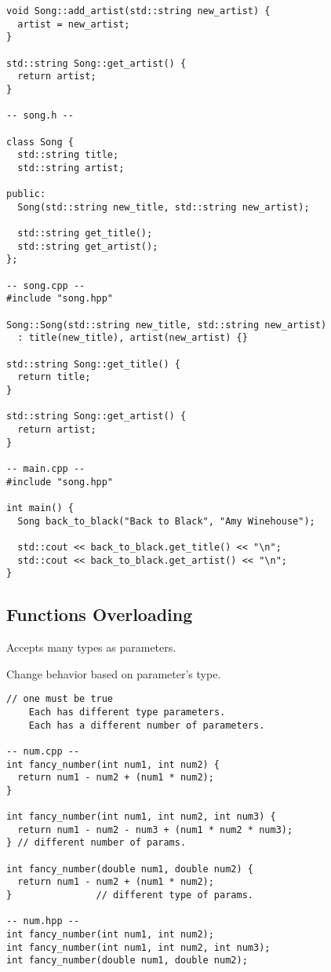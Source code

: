 \documentclass[openany]{report}
\begin{document}
\begin{verbatim}
void Song::add_artist(std::string new_artist) {
  artist = new_artist;
}

std::string Song::get_artist() {
  return artist;
}

-- song.h --

class Song {
  std::string title;
  std::string artist;

public:
  Song(std::string new_title, std::string new_artist);

  std::string get_title();
  std::string get_artist();
};

-- song.cpp --
#include "song.hpp"

Song::Song(std::string new_title, std::string new_artist)
  : title(new_title), artist(new_artist) {}

std::string Song::get_title() {
  return title;
}

std::string Song::get_artist() {
  return artist;
}

-- main.cpp --
#include "song.hpp"

int main() { 
  Song back_to_black("Back to Black", "Amy Winehouse");

  std::cout << back_to_black.get_title() << "\n";
  std::cout << back_to_black.get_artist() << "\n";
}
\end{verbatim}

\subsection{Functions Overloading}

Accepts many types as parameters.

Change behavior based on parameter's type.

\begin{verbatim}
// one must be true
    Each has different type parameters.
    Each has a different number of parameters.
    
-- num.cpp --
int fancy_number(int num1, int num2) {
  return num1 - num2 + (num1 * num2);
}

int fancy_number(int num1, int num2, int num3) {
  return num1 - num2 - num3 + (num1 * num2 * num3);
} // different number of params.

int fancy_number(double num1, double num2) {
  return num1 - num2 + (num1 * num2);
}               // different type of params.

-- num.hpp --
int fancy_number(int num1, int num2);
int fancy_number(int num1, int num2, int num3);
int fancy_number(double num1, double num2);
\end{verbatim}
\end{document}
